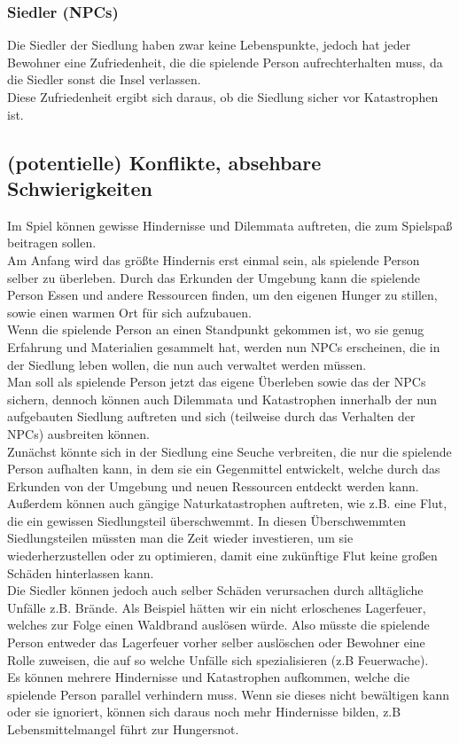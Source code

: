 \documentclass[paper=A4,pagesize=auto,12pt,headinclude=true,footinclude=true,BCOR=0mm,DIV=calc]{scrartcl}
\newcommand{\sectionspace}{
	\vspace{0.5cm}
}
\begin{document}
\subsubsection{Siedler (NPCs)}
Die Siedler der Siedlung haben zwar keine Lebenspunkte, jedoch hat jeder Bewohner eine Zufriedenheit, die die spielende Person aufrechterhalten muss, da die Siedler sonst die Insel verlassen.\\
Diese Zufriedenheit ergibt sich daraus, ob die Siedlung sicher vor Katastrophen ist.

\sectionspace
\subsection{(potentielle) Konflikte, absehbare Schwierigkeiten}\label{sec:Konflikte}

Im Spiel können gewisse Hindernisse und Dilemmata auftreten, die zum Spielspaß beitragen sollen.\\

Am Anfang wird das größte Hindernis erst einmal sein, als spielende Person selber zu überleben.
Durch das Erkunden der Umgebung kann die spielende Person Essen und andere Ressourcen finden, um den eigenen Hunger zu stillen, sowie einen warmen Ort für sich aufzubauen.\\
Wenn die spielende Person an einen Standpunkt gekommen ist, wo sie genug Erfahrung und Materialien gesammelt hat, werden nun NPCs erscheinen, die in der Siedlung leben wollen, die nun auch verwaltet werden müssen.\\
Man soll als spielende Person jetzt das eigene Überleben sowie das der NPCs sichern, dennoch können auch Dilemmata und Katastrophen innerhalb der nun aufgebauten Siedlung auftreten und sich (teilweise durch das Verhalten der NPCs) ausbreiten können.\\
Zunächst könnte sich in der Siedlung eine Seuche verbreiten, die nur die spielende Person aufhalten kann, in dem sie ein Gegenmittel entwickelt, welche durch das Erkunden von der Umgebung und neuen Ressourcen entdeckt werden kann.\\
Außerdem können auch gängige Naturkatastrophen auftreten, wie z.B. eine Flut, die ein gewissen Siedlungsteil überschwemmt. In diesen Überschwemmten Siedlungsteilen müssten man die Zeit wieder investieren, um sie wiederherzustellen oder zu optimieren, damit eine zukünftige Flut keine großen Schäden hinterlassen kann.\\
Die Siedler können jedoch auch selber Schäden verursachen durch alltägliche Unfälle z.B. Brände. Als Beispiel hätten wir ein nicht erloschenes Lagerfeuer, welches zur Folge einen Waldbrand auslösen würde. Also müsste die spielende Person entweder das Lagerfeuer vorher selber auslöschen oder Bewohner eine Rolle zuweisen, die auf so welche Unfälle sich spezialisieren (z.B Feuerwache). \\
Es können mehrere Hindernisse und Katastrophen aufkommen, welche die spielende Person parallel verhindern muss. Wenn sie dieses nicht bewältigen kann oder sie ignoriert, können sich daraus noch mehr Hindernisse bilden, z.B Lebensmittelmangel führt zur Hungersnot.
\end{document}
